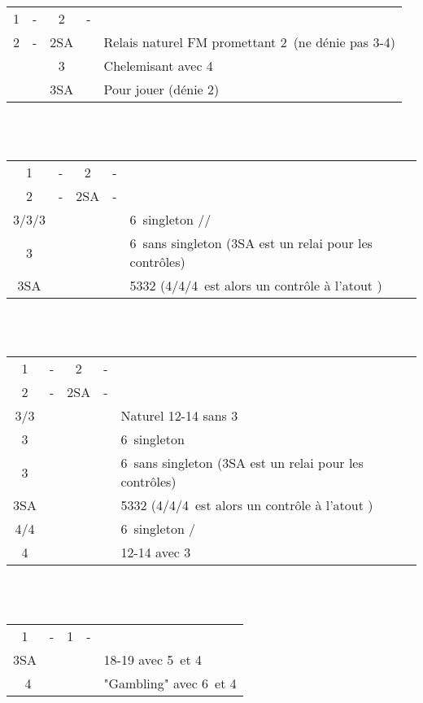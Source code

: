 \documentclass[a4paper, oneside, 11pt]{report}
\begin{document}
		\begin{tabular}{cccc|l}
		1\pique & - & 2\carreau & - &\\
		2\pique & - & 2SA && Relais naturel FM promettant 2\pique\ (ne dénie pas 3-4\pique)\\
		&& 3\pique && Chelemisant avec 4\pique\\
		&& 3SA && Pour jouer (dénie 2\pique)\\
		\end{tabular}\\\\

		\begin{tabular}{cccc|l}
		1\pique & - & 2\trefle & - &\\
		2\pique & - & 2SA & - &\\
		3\trefle/3\carreau/3\coeur &&&& 6\pique\ singleton \trefle/\carreau/\coeur\\
		3\pique &&&& 6\pique\ sans singleton (3SA est un relai pour les contrôles)\\
		3SA &&&& 5332 (4\trefle/4\carreau/4\coeur\ est alors un contrôle à l'atout \pique)\\
		\end{tabular}\\\\

		\begin{tabular}{cccc|l}
		1\pique & - & 2\coeur & - &\\
		2\pique & - & 2SA & - &\\
		3\trefle/3\carreau &&&& Naturel 12-14 sans 3\coeur\\
		3\coeur &&&& 6\pique\ singleton \coeur\\
		3\pique &&&& 6\pique\ sans singleton (3SA est un relai pour les contrôles)\\
		3SA &&&& 5332  (4\trefle/4\carreau/4\coeur\ est alors un contrôle à l'atout \pique)\\
		4\trefle/4\carreau &&&& 6\pique\ singleton \trefle/\carreau\\
		4\coeur &&&& 12-14 avec 3\coeur\\
		\end{tabular}\\\\

		\begin{tabular}{cccc|l}
		1\coeur & - & 1\pique & - &\\
		3SA &&&& 18-19 avec 5\coeur\ et 4\pique\\\
		4\pique &&&& "Gambling" avec 6\coeur\ et 4\pique\\
		\end{tabular}\\\\
\end{document}

